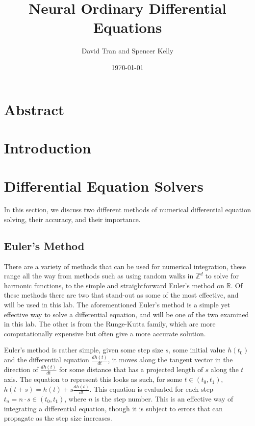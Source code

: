 \documentclass[11pt]{article}
\title{Neural Ordinary Differential Equations}
\author{David Tran and Spencer Kelly}
\date{\today}
\begin{document}
\maketitle

\section*{Abstract}

\section{Introduction}

\section{Differential Equation Solvers}

In this section, we discuss two different methods of numerical differential equation solving, their accuracy, and their importance.

\subsection{Euler's Method}
  There are a variety of methods that can be used for numerical integration, these range all the way from methods such as using random walks in $\mathbb{Z}^d$ to solve for harmonic functions, to the simple and straightforward Euler's method on $\mathbb{R}$.
    Of these methods there are two that stand-out as some of the most effective, and will be used in this lab.
    The aforementioned Euler's method is a simple yet effective way to solve a differential equation, and will be one of the two examined in this lab.
    The other is from the Runge-Kutta family, which are more computationally expensive but often give a more accurate solution.

    Euler's method is rather simple, given some step size $s$, some initial value $h(t_0)$ and the differential equation $\frac{dh(t)}{dt}$, it moves along the tangent vector in the direction of $\frac{dh(t)}{dt}$ for some distance that has a projected length of $s$ along the $t$ axis.
    The equation to represent this looks as such, for some $t \in (t_0,t_1)$, $h(t + s) = h(t) + s\frac{dh(t)}{dt}$.
    This equation is evaluated for each step $t_n = n\cdot s \in (t_0,t_1)$, where $n$ is the step number.
    This is an effective way of integrating a differential equation, though it is subject to errors that can propagate as the step size increases.
\end{document}
